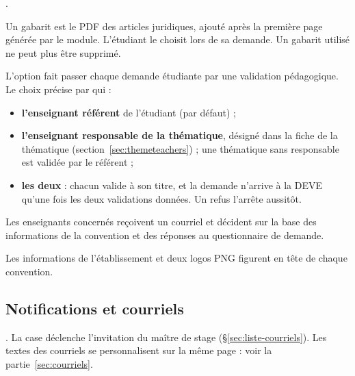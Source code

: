 \documentclass[11pt,a4paper]{article}
\begin{document}
.

Un gabarit est le PDF des articles juridiques, ajouté après la première page
générée par le module. L'étudiant le choisit lors de sa demande. Un gabarit
utilisé ne peut plus être supprimé.


L'option  fait passer chaque demande étudiante par une validation
pédagogique. Le choix  précise par qui :
\begin{itemize}
  \item \textbf{l'enseignant référent} de l'étudiant (par défaut) ;
  \item \textbf{l'enseignant responsable de la thématique}, désigné dans la fiche
    de la thématique (section~\ref{sec:themeteachers}) ; une thématique sans
    responsable est validée par le référent ;
  \item \textbf{les deux} : chacun valide à son titre, et la demande n'arrive à
    la DEVE qu'une fois les deux validations données. Un refus l'arrête aussitôt.
\end{itemize}
Les enseignants concernés reçoivent un courriel et décident sur la base des
informations de la convention et des réponses au questionnaire de demande.


Les informations de l'établissement et deux logos PNG figurent en tête de chaque
convention.


\subsection{Notifications et courriels}
\label{sec:notifs}

. La case  déclenche l'invitation du maître de stage
(§\ref{sec:liste-courriels}). Les textes des courriels se personnalisent sur la
même page : voir la partie~\ref{sec:courriels}.

\end{document}
